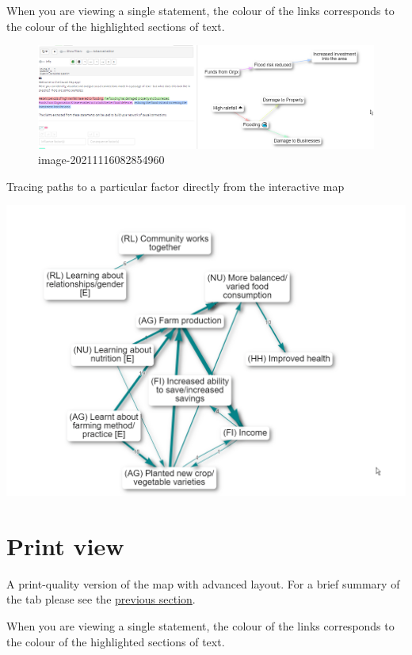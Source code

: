\documentclass[
]{book}
\begin{document}
When you are viewing a single statement, the colour of the links corresponds to the colour of the highlighted sections of text.

\begin{figure}
\centering
\includegraphics{_assets/image-20211116082854960.png}
\caption{image-20211116082854960}
\end{figure}

Tracing paths to a particular factor directly from the interactive map

\includegraphics{_assets/BhOlErDmwB.gif}

\hypertarget{print-view}{%
\chapter{Print view}\label{print-view}}

A print-quality version of the map with advanced layout. For a brief summary of the tab please see the \protect\hyperlink{xinteractive-view}{previous section}.

When you are viewing a single statement, the colour of the links corresponds to the colour of the highlighted sections of text.
\end{document}
